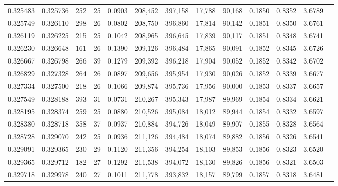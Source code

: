 \begin{tabular}{rrrrrrrrrrrrr}
0.325483 & 0.325736 &    252 &    25 &                                     0.0903 & 208,452 & 397,158 &  17,788 &  90,168 & 0.1850 & 0.8352 & 3.6789 \\
0.325749 & 0.326110 &    298 &    26 &                                     0.0802 & 208,750 & 396,860 &  17,814 &  90,142 & 0.1851 & 0.8350 & 3.6761 \\
0.326119 & 0.326225 &    215 &    25 &                                     0.1042 & 208,965 & 396,645 &  17,839 &  90,117 & 0.1851 & 0.8348 & 3.6741 \\
0.326230 & 0.326648 &    161 &    26 &                                     0.1390 & 209,126 & 396,484 &  17,865 &  90,091 & 0.1852 & 0.8345 & 3.6726 \\
0.326667 & 0.326798 &    266 &    39 &                                     0.1279 & 209,392 & 396,218 &  17,904 &  90,052 & 0.1852 & 0.8342 & 3.6702 \\
0.326829 & 0.327328 &    264 &    26 &                                     0.0897 & 209,656 & 395,954 &  17,930 &  90,026 & 0.1852 & 0.8339 & 3.6677 \\
0.327334 & 0.327500 &    218 &    26 &                                     0.1066 & 209,874 & 395,736 &  17,956 &  90,000 & 0.1853 & 0.8337 & 3.6657 \\
0.327549 & 0.328188 &    393 &    31 &                                     0.0731 & 210,267 & 395,343 &  17,987 &  89,969 & 0.1854 & 0.8334 & 3.6621 \\
0.328195 & 0.328374 &    259 &    25 &                                     0.0880 & 210,526 & 395,084 &  18,012 &  89,944 & 0.1854 & 0.8332 & 3.6597 \\
0.328380 & 0.328718 &    358 &    37 &                                     0.0937 & 210,884 & 394,726 &  18,049 &  89,907 & 0.1855 & 0.8328 & 3.6564 \\
0.328728 & 0.329070 &    242 &    25 &                                     0.0936 & 211,126 & 394,484 &  18,074 &  89,882 & 0.1856 & 0.8326 & 3.6541 \\
0.329091 & 0.329365 &    230 &    29 &                                     0.1120 & 211,356 & 394,254 &  18,103 &  89,853 & 0.1856 & 0.8323 & 3.6520 \\
0.329365 & 0.329712 &    182 &    27 &                                     0.1292 & 211,538 & 394,072 &  18,130 &  89,826 & 0.1856 & 0.8321 & 3.6503 \\
0.329718 & 0.329978 &    240 &    27 &                                     0.1011 & 211,778 & 393,832 &  18,157 &  89,799 & 0.1857 & 0.8318 & 3.6481 \\

\end{tabular}
